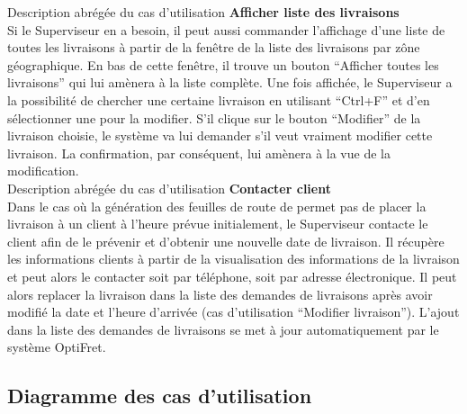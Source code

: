 \documentclass[a4paper]{report}
\begin{document}
Description abrégée du cas d’utilisation \textbf{Afficher liste des
    livraisons}\\

Si le Superviseur en a besoin, il peut aussi commander l’affichage d’une liste
de toutes les livraisons à partir de la fenêtre de la liste des livraisons par
zône géographique. En bas de cette fenêtre, il trouve un bouton “Afficher
toutes les livraisons” qui lui amènera à la liste complète. Une fois affichée,
le Superviseur a la possibilité de chercher une certaine livraison en utilisant
“Ctrl+F” et d’en sélectionner une pour la modifier. S’il clique sur le bouton
“Modifier” de la livraison choisie, le système va lui demander s’il veut
vraiment modifier cette livraison. La confirmation, par conséquent, lui amènera
à la vue de la modification.\\

Description abrégée du cas d’utilisation \textbf{Contacter client}\\

Dans le cas où la génération des feuilles de route de permet pas de placer la
livraison à un client à l’heure prévue initialement, le Superviseur contacte le
client afin de le prévenir et d’obtenir une nouvelle date de livraison. Il
récupère les informations clients à partir de la visualisation des informations
de la livraison et peut alors le contacter soit par téléphone, soit par adresse
électronique. Il peut alors replacer la livraison dans la liste des demandes de
livraisons après avoir modifié la date et l’heure d’arrivée (cas d’utilisation
“Modifier livraison”). L’ajout dans la liste des demandes de livraisons se met
à jour automatiquement par le système OptiFret.\\

\subsection{Diagramme des cas d'utilisation}
\end{document}
